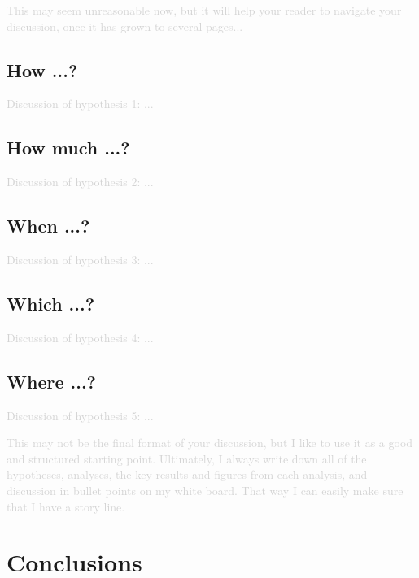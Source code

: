 \documentclass[twocolumn,apj,numberedappendix,appendixfloats]{openjournal}
\newcommand{\comment}[1]{\textcolor{lightgray}{#1}}
\begin{document}
\comment{This may seem unreasonable now, but it will help your reader to navigate your discussion, once it has grown to several pages...}

\subsection{How ...?} \label{sec:discussion_hypothesis1}

\comment{Discussion of hypothesis 1: ...}

\subsection{How much ...?} \label{sec:discussion_hypothesis2}

\comment{Discussion of hypothesis 2: ...}

\subsection{When ...?} \label{sec:discussion_hypothesis3}

\comment{Discussion of hypothesis 3: ...}

\subsection{Which ...?} \label{sec:discussion_hypothesis4}

\comment{Discussion of hypothesis 4: ...}

\subsection{Where ...?} \label{sec:discussion_hypothesis5}

\comment{Discussion of hypothesis 5: ...}


\comment{This may not be the final format of your discussion, but I like to use it as a good and structured starting point. Ultimately, I always write down all of the hypotheses, analyses, the key results and figures from each analysis, and discussion in bullet points on my white board. That way I can easily make sure that I have a story line.}

\clearpage
\section{Conclusions} \label{sec:conclusions}
\end{document}
